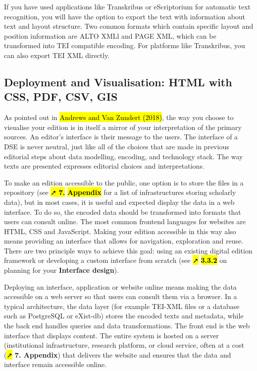 \documentclass[
  letterpaper,
  DIV=11,
  numbers=noendperiod]{scrreprt}
\begin{document}
If you have used applications like Transkribus or eScriptorium for
automatic text recognition, you will have the option to export the text
with information about text and layout structure. Two common formats
which contain specific layout and position information are ALTO XMLl and
PAGE XML, which can be transformed into TEI compatible encoding. For
platforms like Transkribus, you can also export TEI XML directly.

\subsection{Deployment and Visualisation: HTML with CSS, PDF, CSV,
GIS}\label{deployment-and-visualisation-html-with-css-pdf-csv-gis}

As pointed out in \hl{Andrews and Van Zundert (2018)}, the way you
choose to visualise your edition is in itself a mirror of your
interpretation of the primary sources. An editor's interface is their
message to the users. The interface of a DSE is never neutral, just like
all of the choices that are made in previous editorial steps about data
modelling, encoding, and technology stack. The way texts are presented
expresses editorial choices and interpretations.

To make an edition accessible to the public, one option is to store the
files in a repository (see \hl{➚ \textbf{7.}} \textbf{\hl{Appendix}} for
a list of infrastructures storing scholarly data), but in most cases, it
is useful and expected display the data in a web interface. To do so,
the encoded data should be transformed into formats that users can
consult online. The most common frontend languages for websites are
HTML, CSS and JavaScript. Making your edition accessible in this way
also means providing an interface that allows for navigation,
exploration and reuse. There are two principle ways to achieve this
goal: using an existing digital edition framework or developing a custom
interface from scratch (see \hl{➚} \textbf{\hl{3.3.2}} on planning for
your \textbf{Interface design}).

Deploying an interface, application or website online means making the
data accessible on a web server so that users can consult them via a
browser. In a typical architecture, the data layer (for example TEI-XML
files or a database such as PostgreSQL or eXist-db) stores the encoded
texts and metadata, while the back end handles queries and data
transformations. The front end is the web interface that displays
content. The entire system is hosted on a server (institutional
infrastructure, research platform, or cloud service, often at a cost
(\hl{➚} \textbf{7. Appendix}) that delivers the website and ensures that
the data and interface remain accessible online.
\end{document}
